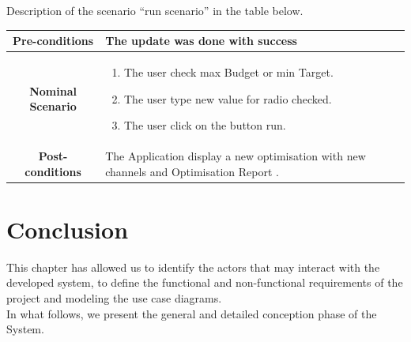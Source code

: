 	 Description of the scenario ``run scenario'' in the table below.
	
	\begin{table}
		\centering
		\begin{tabular}{|c|p{10cm}|}
			\hline 	
			\textbf{Pre-conditions } & The update was done with success \\ 
			\hline                     
			\textbf{Nominal Scenario } & \begin{enumerate}
				\item The user check max Budget or min Target.
				\item The user type new value for radio checked.
				\item The user click on the button run. 
			\end{enumerate} \\ 
			\hline 
			\textbf{Post-conditions} & The Application display a new optimisation with new channels and Optimisation Report  . \\
			\hline 
		\end{tabular}
	\end{table}
	\clearpage
	\newpage
	
	\section{Conclusion}
	This chapter has allowed us to identify the actors that may interact with the developed system, to define the functional and non-functional requirements of the project and modeling the use case diagrams.
	\\
	In what follows, we present the general and detailed conception phase of the System.  
	

